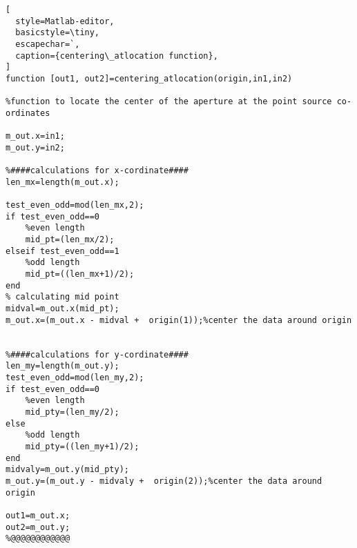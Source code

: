 \begin{lstlisting}[
  style=Matlab-editor,
  basicstyle=\tiny,
  escapechar=`,
  caption={centering\_atlocation function},
]
function [out1, out2]=centering_atlocation(origin,in1,in2)

%function to locate the center of the aperture at the point source co-ordinates

m_out.x=in1;
m_out.y=in2;

%####calculations for x-cordinate####
len_mx=length(m_out.x);

test_even_odd=mod(len_mx,2);
if test_even_odd==0
    %even length
    mid_pt=(len_mx/2);
elseif test_even_odd==1
    %odd length
    mid_pt=((len_mx+1)/2);
end
% calculating mid point
midval=m_out.x(mid_pt);
m_out.x=(m_out.x - midval +  origin(1));%center the data around origin


%####calculations for y-cordinate####
len_my=length(m_out.y);
test_even_odd=mod(len_my,2);
if test_even_odd==0
    %even length
    mid_pty=(len_my/2);
else
    %odd length
    mid_pty=((len_my+1)/2);
end
midvaly=m_out.y(mid_pty);
m_out.y=(m_out.y - midvaly +  origin(2));%center the data around origin

out1=m_out.x;
out2=m_out.y;
%@@@@@@@@@@@@
   

\end{lstlisting}


